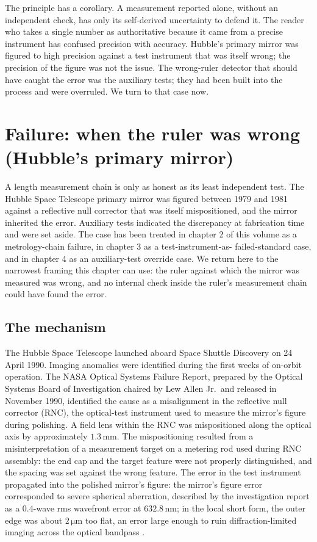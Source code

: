 The principle has a corollary. A measurement reported alone, without
an independent check, has only its self-derived uncertainty to defend
it. The reader who takes a single number as authoritative because it
came from a precise instrument has confused precision with accuracy.
Hubble's primary mirror was figured to high precision against a
test instrument that was itself wrong; the precision of the figure
was not the issue. The wrong-ruler detector that should have caught
the error was the auxiliary tests; they had been built into the
process and were overruled. We turn to that case now.

\section{Failure: when the ruler was wrong (Hubble's primary
mirror)}

A length measurement chain is only as honest as its least independent
test. The Hubble Space Telescope primary mirror was figured between
1979 and 1981 against a reflective null corrector that was itself
mispositioned, and the mirror inherited the error. Auxiliary tests
indicated the discrepancy at fabrication time and were set aside.
The case has been treated in chapter 2 of this volume as a
metrology-chain failure, in chapter 3 as a test-instrument-as-
failed-standard case, and in chapter 4 as an auxiliary-test override
case. We return here to the narrowest framing this chapter can use:
the ruler against which the mirror was measured was wrong, and no
internal check inside the ruler's measurement chain could have
found the error.

\subsection{The mechanism}

The Hubble Space Telescope launched aboard Space Shuttle Discovery
on 24 April 1990. Imaging anomalies were identified during the first
weeks of on-orbit operation. The NASA Optical Systems Failure
Report, prepared by the Optical Systems Board of Investigation
chaired by Lew Allen Jr.\ and released in November 1990, identified
the cause as a misalignment in the reflective null corrector (RNC),
the optical-test instrument used to measure the mirror's figure
during polishing. A field lens within the RNC was mispositioned along
the optical axis by approximately $1.3 \,\si{\milli\meter}$. The
mispositioning resulted from a misinterpretation of a measurement
target on a metering rod used during RNC assembly: the end cap and
the target feature were not properly distinguished, and the spacing
was set against the wrong feature. The error in the test instrument
propagated into the polished mirror's figure: the mirror's figure
error corresponded to severe spherical aberration, described by the
investigation report as a $0.4$-wave rms wavefront error at $632.8
\,\si{\nano\meter}$; in the local short form, the outer edge was
about $2 \,\si{\micro\meter}$ too flat, an error large enough to
ruin diffraction-limited imaging across the optical bandpass
\cite{acc:nasa-hubble-optical-systems-1990}.


